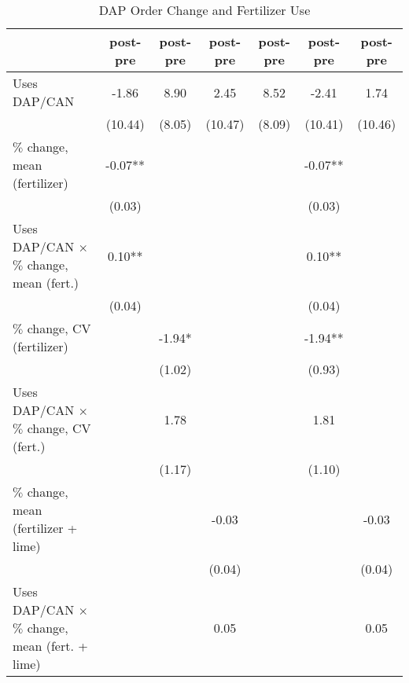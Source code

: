 \begin{table}[htbp]
\centering
\hspace*{-1.2cm}
\begin{threeparttable}
\small
\caption{DAP Order Change and Fertilizer Use}
\label{tab:A2dap_int}
\begin{tabular}{l cccccc}
\hline
\hline
                    &\multicolumn{1}{c}{post-pre}&\multicolumn{1}{c}{post-pre}&\multicolumn{1}{c}{post-pre}&\multicolumn{1}{c}{post-pre}&\multicolumn{1}{c}{post-pre}&\multicolumn{1}{c}{post-pre}\\
\hline
Uses DAP/CAN        &       -1.86   &        8.90   &        2.45   &        8.52   &       -2.41   &        1.74   \\
                    &     (10.44)   &      (8.05)   &     (10.47)   &      (8.09)   &     (10.41)   &     (10.46)   \\
$\%$ change, mean (fertilizer)&       -0.07** &               &               &               &       -0.07** &               \\
                    &      (0.03)   &               &               &               &      (0.03)   &               \\
Uses DAP/CAN $\times$ $\%$ change, mean (fert.)&        0.10** &               &               &               &        0.10** &               \\
                    &      (0.04)   &               &               &               &      (0.04)   &               \\
$\%$ change, CV (fertilizer)&               &       -1.94*  &               &               &       -1.94** &               \\
                    &               &      (1.02)   &               &               &      (0.93)   &               \\
Uses DAP/CAN $\times$ $\%$ change, CV (fert.)&               &        1.78   &               &               &        1.81   &               \\
                    &               &      (1.17)   &               &               &      (1.10)   &               \\
$\%$ change, mean (fertilizer + lime)&               &               &       -0.03   &               &               &       -0.03   \\
                    &               &               &      (0.04)   &               &               &      (0.04)   \\
Uses DAP/CAN $\times$ $\%$ change, mean (fert. + lime)&               &               &        0.05   &               &               &        0.05   \\

\end{tabular}
\end{threeparttable}
\end{table}
